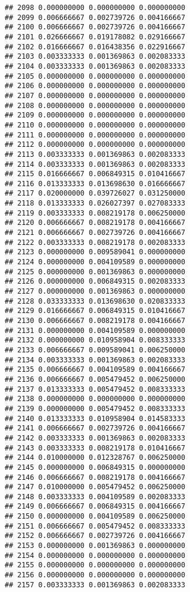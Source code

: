 \documentclass[
]{article}
\begin{document}
\begin{verbatim}
## 2098 0.000000000 0.000000000 0.000000000
## 2099 0.006666667 0.002739726 0.004166667
## 2100 0.006666667 0.002739726 0.004166667
## 2101 0.026666667 0.019178082 0.029166667
## 2102 0.016666667 0.016438356 0.022916667
## 2103 0.003333333 0.001369863 0.002083333
## 2104 0.003333333 0.001369863 0.002083333
## 2105 0.000000000 0.000000000 0.000000000
## 2106 0.000000000 0.000000000 0.000000000
## 2107 0.000000000 0.000000000 0.000000000
## 2108 0.000000000 0.000000000 0.000000000
## 2109 0.000000000 0.000000000 0.000000000
## 2110 0.000000000 0.000000000 0.000000000
## 2111 0.000000000 0.000000000 0.000000000
## 2112 0.000000000 0.000000000 0.000000000
## 2113 0.003333333 0.001369863 0.002083333
## 2114 0.003333333 0.001369863 0.002083333
## 2115 0.016666667 0.006849315 0.010416667
## 2116 0.013333333 0.013698630 0.016666667
## 2117 0.020000000 0.039726027 0.031250000
## 2118 0.013333333 0.026027397 0.027083333
## 2119 0.003333333 0.008219178 0.006250000
## 2120 0.006666667 0.008219178 0.004166667
## 2121 0.006666667 0.002739726 0.004166667
## 2122 0.003333333 0.008219178 0.002083333
## 2123 0.000000000 0.009589041 0.000000000
## 2124 0.000000000 0.004109589 0.000000000
## 2125 0.000000000 0.001369863 0.000000000
## 2126 0.000000000 0.006849315 0.002083333
## 2127 0.000000000 0.001369863 0.000000000
## 2128 0.033333333 0.013698630 0.020833333
## 2129 0.016666667 0.006849315 0.010416667
## 2130 0.006666667 0.008219178 0.004166667
## 2131 0.000000000 0.004109589 0.000000000
## 2132 0.000000000 0.010958904 0.008333333
## 2133 0.006666667 0.009589041 0.006250000
## 2134 0.003333333 0.001369863 0.002083333
## 2135 0.006666667 0.004109589 0.004166667
## 2136 0.006666667 0.005479452 0.006250000
## 2137 0.013333333 0.005479452 0.008333333
## 2138 0.000000000 0.000000000 0.000000000
## 2139 0.000000000 0.005479452 0.008333333
## 2140 0.013333333 0.010958904 0.014583333
## 2141 0.006666667 0.002739726 0.004166667
## 2142 0.003333333 0.001369863 0.002083333
## 2143 0.003333333 0.008219178 0.010416667
## 2144 0.010000000 0.012328767 0.006250000
## 2145 0.000000000 0.006849315 0.000000000
## 2146 0.006666667 0.008219178 0.004166667
## 2147 0.010000000 0.005479452 0.006250000
## 2148 0.003333333 0.004109589 0.002083333
## 2149 0.006666667 0.006849315 0.004166667
## 2150 0.000000000 0.004109589 0.006250000
## 2151 0.006666667 0.005479452 0.008333333
## 2152 0.006666667 0.002739726 0.004166667
## 2153 0.000000000 0.001369863 0.000000000
## 2154 0.000000000 0.000000000 0.000000000
## 2155 0.000000000 0.000000000 0.000000000
## 2156 0.000000000 0.000000000 0.000000000
## 2157 0.003333333 0.001369863 0.002083333

\end{verbatim}
\end{document}

